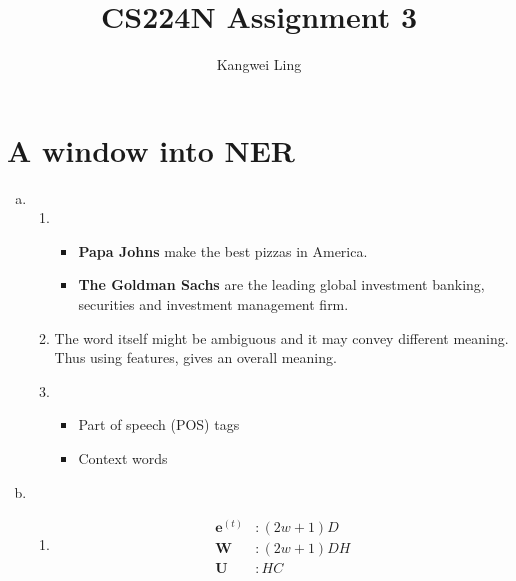 \documentclass{article}[11pt]
\title{CS224N Assignment 3}
\author{Kangwei Ling}
\newcommand{\bW} { \bm{W} }
\newcommand{\bU} { \bm{U} }
\newcommand{\be} { \bm{e}}
\newcommand{\bet}[1][t]{ \be^{(#1)}}
\begin{document}
\maketitle

\section{A window into NER}

\begin{enumerate}[(a)]
\item 
	\begin{enumerate}[(i.)]
	\item 
		\begin{itemize}
		\item \textbf{Papa Johns} make the best pizzas in America.
		\item \textbf{The Goldman Sachs} are the leading global investment banking, securities and investment management firm.
		\end{itemize}
	\item 
		The word itself might be ambiguous and it may convey different meaning.
		Thus using features, gives an overall meaning.
		
	\item
		\begin{itemize}
		\item Part of speech (POS) tags
		\item Context words  
		\end{itemize}
		\end{enumerate}
\item
	\begin{enumerate}[(i.)]
	\item 
		\begin{align*}
		\bet &: (2w+1)D \\
		\bW  &: (2w+1)DH \\
		\bU  &: HC
		\end{align*}
	\end{enumerate}
\end{enumerate}
\end{document}
